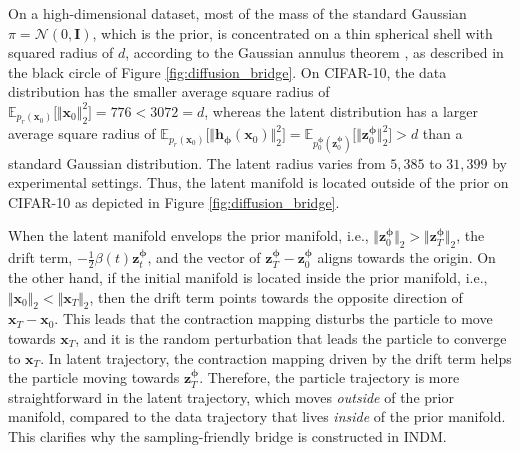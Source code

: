 \documentclass{article}
\theoremstyle{definition}
\theoremstyle{remark}
\begin{document}
	
	On a high-dimensional dataset, most of the mass of the standard Gaussian $\pi=\mathcal{N}(0,\mathbf{I})$, which is the prior, is concentrated on a thin spherical shell with squared radius of $d$, according to the Gaussian annulus theorem \cite{blum2020foundations}, as described in the black circle of Figure \ref{fig:diffusion_bridge}. On CIFAR-10, the data distribution has the smaller average square radius of $\mathbb{E}_{p_{r}(\mathbf{x}_{0})}\big[\Vert\mathbf{x}_{0}\Vert_{2}^{2}\big]=776<3072=d$, whereas the latent distribution has a larger average square radius of $\mathbb{E}_{p_{r}(\mathbf{x}_{0})}\big[\Vert\mathbf{h}_{\bm{\phi}}(\mathbf{x}_{0})\Vert_{2}^{2}\big]=\mathbb{E}_{p_{0}^{\bm{\phi}}(\mathbf{z}_{0}^{\bm{\phi}})}\big[\Vert\mathbf{z}_{0}^{\bm{\phi}}\Vert_{2}^{2}\big]>d$ than a standard Gaussian distribution. The latent radius varies from $5,385$ to $31,399$ by experimental settings. Thus, the latent manifold is located outside of the prior on CIFAR-10 as depicted in Figure \ref{fig:diffusion_bridge}. 
	
	When the latent manifold envelops the prior manifold, i.e., $\Vert\mathbf{z}_{0}^{\bm{\phi}}\Vert_{2}>\Vert\mathbf{z}_{T}^{\bm{\phi}}\Vert_{2}$, the drift term, $-\frac{1}{2}\beta(t)\mathbf{z}_{t}^{\bm{\phi}}$, and the vector of $\mathbf{z}_{T}^{\bm{\phi}}-\mathbf{z}_{0}^{\bm{\phi}}$ aligns towards the origin. On the other hand, if the initial manifold is located inside the prior manifold, i.e., $\Vert\mathbf{x}_{0}\Vert_{2}<\Vert\mathbf{x}_{T}\Vert_{2}$, then the drift term points towards the opposite direction of $\mathbf{x}_{T}-\mathbf{x}_{0}$. This leads that the contraction mapping disturbs the particle to move towards $\mathbf{x}_{T}$, and it is the random perturbation that leads the particle to converge to $\mathbf{x}_{T}$. In latent trajectory, the contraction mapping driven by the drift term helps the particle moving towards $\mathbf{z}_{T}^{\bm{\phi}}$. Therefore, the particle trajectory is more straightforward in the latent trajectory, which moves \textit{outside} of the prior manifold, compared to the data trajectory that lives \textit{inside} of the prior manifold. This clarifies why the sampling-friendly bridge is constructed in INDM.
	
\end{document}
